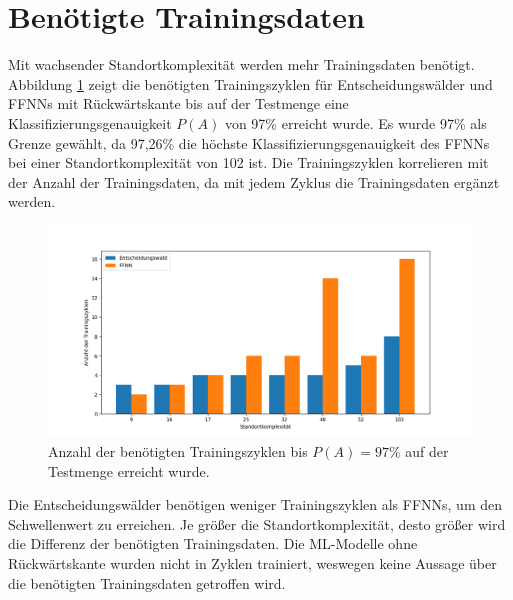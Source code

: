 \section{Benötigte Trainingsdaten}
Mit wachsender Standortkomplexität werden mehr Trainingsdaten benötigt.
Abbildung \ref{fig:required_training_data} zeigt die benötigten Trainingszyklen für Entscheidungswälder und FFNNs mit Rückwärtskante bis auf der Testmenge
eine Klassifizierungsgenauigkeit $P(A)$ von 97\% erreicht wurde.
Es wurde 97\% als Grenze gewählt, da 97,26\% die höchste Klassifizierungsgenauigkeit des FFNNs bei einer Standortkomplexität von 102 ist.
Die Trainingszyklen korrelieren mit der Anzahl der Trainingsdaten, da mit jedem Zyklus die Trainingsdaten ergänzt werden.
\begin{figure}[h!]
    \centering
    \includegraphics[width=\linewidth]{images/required_training_data.png}
    \caption{Anzahl der benötigten Trainingszyklen bis $P(A)=97\%$ auf der Testmenge erreicht wurde. }
    \label{fig:required_training_data}
\end{figure}
\newpage
Die Entscheidungswälder benötigen weniger Trainingszyklen als FFNNs, um den Schwellenwert zu erreichen.
Je größer die Standortkomplexität, desto größer wird die Differenz der benötigten Trainingsdaten.
Die ML-Modelle ohne Rückwärtskante wurden nicht in Zyklen trainiert, weswegen keine Aussage über die benötigten Trainingsdaten getroffen wird.